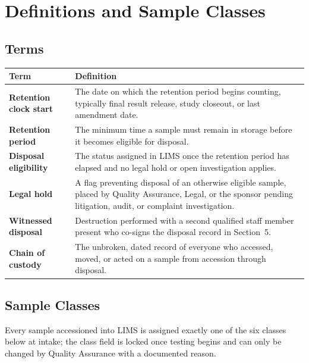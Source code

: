 
\section{Definitions and Sample Classes}

\subsection{Terms}
\begin{tabularx}{\textwidth}{@{}>{\bfseries}p{3.6cm} Y@{}}
\toprule
Term & Definition \\
\midrule
Retention clock start & The date on which the retention period begins counting, typically
  final result release, study closeout, or last amendment date. \\
Retention period & The minimum time a sample must remain in storage before it becomes
  eligible for disposal. \\
Disposal eligibility & The status assigned in LIMS once the retention period has elapsed and
  no legal hold or open investigation applies. \\
Legal hold & A flag preventing disposal of an otherwise eligible sample, placed by Quality
  Assurance, Legal, or the sponsor pending litigation, audit, or complaint investigation. \\
Witnessed disposal & Destruction performed with a second qualified staff member present who
  co-signs the disposal record in Section~5. \\
Chain of custody & The unbroken, dated record of everyone who accessed, moved, or acted on a
  sample from accession through disposal. \\
\bottomrule
\end{tabularx}

\subsection{Sample Classes}
Every sample accessioned into LIMS is assigned exactly one of the six classes below at intake;
the class field is locked once testing begins and can only be changed by Quality Assurance
with a documented reason.

